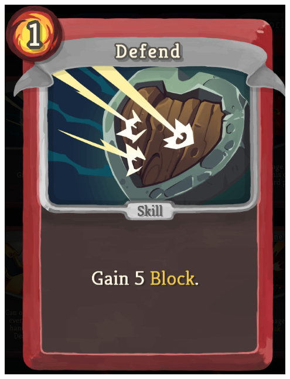 \begin{center}
    \captionsetup{type=figure}
    \begin{minipage}{.25\textwidth}
        \centering
        \includegraphics[width=0.95\textwidth]{img/Slay-the-Spire-Defend.png}
    \end{minipage}%
    \begin{minipage}{.25\textwidth}
        \centering

\end{minipage}
\end{center}
